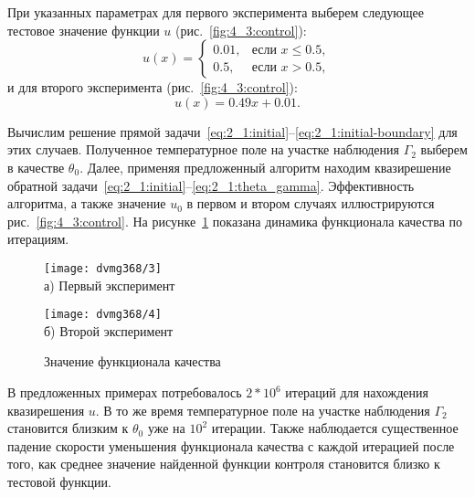 При указанных параметрах для первого эксперимента выберем следующее тестовое
значение функции $u$ (рис.~\ref{fig:4_3:control}):
\begin{equation}
    \label{eq:4_3:equation}
    u(x)=
    \begin{cases}
        0.01, & \text{если } x \le 0.5, \\
        0.5, & \text{если } x > 0.5,
    \end{cases}
\end{equation}
и для второго эксперимента (рис.~\ref{fig:4_3:control}):
\begin{equation}
    \label{eq:4_3:test_function_1}
    u(x)=0.49x+0.01.
\end{equation}

Вычислим решение прямой
задачи~\eqref{eq:2_1:initial}--\eqref{eq:2_1:initial-boundary}
для этих случаев.
Полученное температурное поле на участке наблюдения
$\Gamma_2$ выберем в качестве $\theta_0$.
Далее, применяя предложенный алгоритм находим квазирешение обратной
задачи~\eqref{eq:2_1:initial}--\eqref{eq:2_1:theta_gamma}.
Эффективность алгоритма, а также значение $u_0$ в первом и
втором случаях иллюстрируются рис.~\ref{fig:4_3:control}.
На рисунке~\ref{fig:4_3:cost} показана динамика функционала качества по итерациям.
\begin{figure}[ht]
    \begin{minipage}[b][][b]{0.49\linewidth}
        \centering
        \texttt{[image: dvmg368/3]} \\ а) Первый эксперимент
    \end{minipage}
    \hfill
    \begin{minipage}[b][][b]{0.49\linewidth}
        \centering
        \texttt{[image: dvmg368/4]} \\ б) Второй эксперимент
    \end{minipage}
    \caption{Значение функционала качества}
    \label{fig:4_3:cost}
\end{figure}

\begin{remark}
    В предложенных примерах потребовалось
    $2*10^6$ итераций для нахождения квазирешения $u$.
    В то же время температурное поле на участке наблюдения
    $\Gamma_2$ становится близким к $\theta_0$ уже на $10^2$ итерации.
    Также наблюдается существенное падение скорости уменьшения функционала
    качества с каждой итерацией после того, как среднее значение найденной
    функции контроля становится близко к тестовой функции.
\end{remark}

